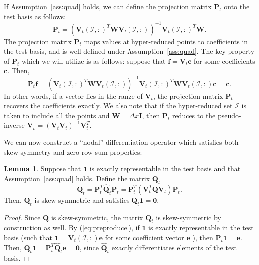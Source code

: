 \documentclass[preprint,10pt]{elsarticle}
\theoremstyle{definition}
\theoremstyle{lemma}
\newtheorem{lemma}{Lemma}
\theoremstyle{theorem}
\theoremstyle{assumption}
\renewcommand{\hat}{\widehat}
\newcommand{\LRp}[1]{\left( #1 \right)}
\begin{document}
If Assumption~\ref{ass:quad} holds, we can define the projection matrix $\bm{P}_t$ onto the test basis as follows:
\begin{equation}
\bm{P}_t = \LRp{\bm{V}_t\LRp{\mathcal{I},:}^T\bm{W}\bm{V}_t\LRp{\mathcal{I},:}}^{-1}\bm{V}_t\LRp{\mathcal{I},:}^T\bm{W}.
\label{eq:Pt}
\end{equation}
The projection matrix $\bm{P}_t$ maps values at hyper-reduced points to coefficients in the test basis, and is well-defined under Assumption~\ref{ass:quad}.  The key property of $\bm{P}_t$ which we will utilize is as follows: suppose that $\bm{f} = \bm{V}_t\bm{c}$ for some coefficients $\bm{c}$.  Then,
\begin{equation}
\bm{P}_t \bm{f} = \LRp{\bm{V}_t\LRp{\mathcal{I},:}^T\bm{W}\bm{V}_t\LRp{\mathcal{I},:}}^{-1}\bm{V}_t\LRp{\mathcal{I},:}^T\bm{W} \bm{V}_t\LRp{\mathcal{I},:}\bm{c} = \bm{c}.
\label{eq:preproduce}
\end{equation}
In other words, if a vector lies in the range of $\bm{V}_t$, the projection matrix $\bm{P}_t$ recovers the coefficients exactly.  We also note that if the hyper-reduced set $\mathcal{I}$ is taken to include all the points and $\bm{W} = \Delta x\bm{I}$, then $\bm{P}_t$ reduces to the pseudo-inverse $\bm{V}_t^{\dagger} = \LRp{\bm{V}_t\bm{V}_t}^{-1}\bm{V}_t^T$.  

We can now construct a ``nodal'' differentiation operator which satisfies both skew-symmetry and zero row sum properties: 
\begin{lemma}
Suppose that $\bm{1}$ is exactly representable in the test basis and that Assumption~\ref{ass:quad} holds.  Define the matrix $\bm{Q}_t$
\begin{equation}
\bm{Q}_t = \bm{P}_t^T\hat{\bm{Q}}_t\bm{P}_t = \bm{P}_t^T\LRp{\bm{V}_t^T\bm{Q}\bm{V}_t}\bm{P}_t.
\label{eq:nodalQ}
\end{equation}
Then, $\bm{Q}_t$ is skew-symmetric and satisfies $\bm{Q}_t\bm{1} = \bm{0}$.  
\label{thm:Qt}
\end{lemma}
\begin{proof}
Since $\bm{Q}$ is skew-symmetric, the matrix $\bm{Q}_t$ is skew-symmetric by construction as well.  By (\ref{eq:preproduce}), if $\bm{1}$ is exactly representable in the test basis (such that $\bm{1} = \bm{V}_t\LRp{\mathcal{I},:}\bm{e}$ for some coefficient vector $\bm{e}$  ), then $\bm{P}_t\bm{1} = \bm{e}$.  Then, $\bm{Q}_t\bm{1} = \bm{P}_t^T\hat{\bm{Q}}_t\bm{e} = \bm{0}$, since $\hat{\bm{Q}}_t$ exactly differentiates elements of the test basis.
\end{proof}
\end{document}
